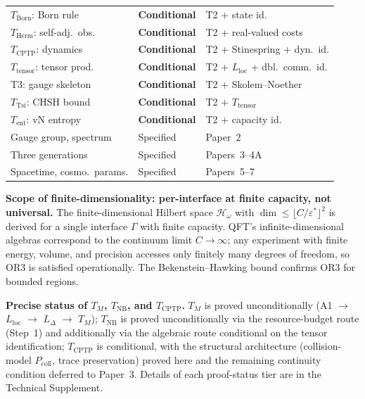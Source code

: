 \documentclass[11pt]{article}
\theoremstyle{remark}
\begin{document}
\begin{center}
{\begin{tabular*}{\textwidth}{@{\extracolsep{\fill}}lll@{}}
$T_{\mathrm{Born}}$: Born rule & \textbf{Conditional} & T2 + state id. \\
$T_{\mathrm{Herm}}$: self-adj.\ obs. & \textbf{Conditional} & T2 + real-valued costs \\
$T_{\mathrm{CPTP}}$: dynamics & \textbf{Conditional} & T2 + Stinespring + dyn.\ id. \\
$T_{\mathrm{tensor}}$: tensor prod. & \textbf{Conditional} & T2 + $L_{\mathrm{loc}}$ + dbl.\ comm.\ id. \\
T3: gauge skeleton & \textbf{Conditional} & T2 + Skolem--Noether \\
$T_{\mathrm{Tsi}}$: CHSH bound & \textbf{Conditional} & T2 + $T_{\mathrm{tensor}}$ \\
$T_{\mathrm{ent}}$: vN entropy & \textbf{Conditional} & T2 + capacity id. \\
\midrule
Gauge group, spectrum & Specified & Paper~2 \\
Three generations & Specified & Papers~3--4A \\
Spacetime, cosmo.\ params. & Specified & Papers~5--7 \\
\bottomrule
\end{tabular*}}
\label{tab:scope}
\end{center}

\smallskip\noindent\textbf{Scope of finite-dimensionality: per-interface at finite capacity, not universal.}
The finite-dimensional Hilbert space $\mathcal{H}_\omega$ with $\dim \le \lfloor C/\varepsilon^* \rfloor^2$ is derived for a single interface $\Gamma$ with finite capacity.  QFT's infinite-dimensional algebras correspond to the continuum limit $C \to \infty$; any experiment with finite energy, volume, and precision accesses only finitely many degrees of freedom, so OR3 is satisfied operationally.  The Bekenstein--Hawking bound confirms OR3 for bounded regions.


\smallskip\noindent\textbf{Precise status of $T_M$, $T_{\mathrm{NB}}$, and $T_{\mathrm{CPTP}}$.}
$T_M$ is proved unconditionally (A1 $\to$ $L_{\mathrm{loc}}$ $\to$ $L_\Delta$ $\to$ $T_M$); $T_{\mathrm{NB}}$ is proved unconditionally via the resource-budget route (Step~1) and additionally via the algebraic route conditional on the tensor identification; $T_{\mathrm{CPTP}}$ is conditional, with the structural architecture (collision-model $P_{\mathrm{coll}}$, trace preservation) proved here and the remaining continuity condition deferred to Paper~3.  Details of each proof-status tier are in the Technical Supplement.
\end{document}
